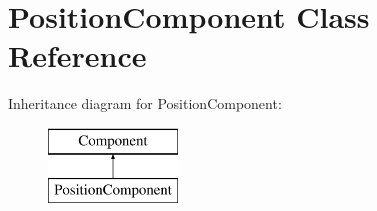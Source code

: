 \hypertarget{classPositionComponent}{}\section{Position\+Component Class Reference}
\label{classPositionComponent}
Inheritance diagram for Position\+Component\+:\begin{figure}[H]
\begin{center}
\leavevmode
\includegraphics[height=2.000000cm]{classPositionComponent}
\end{center}
\end{figure}
